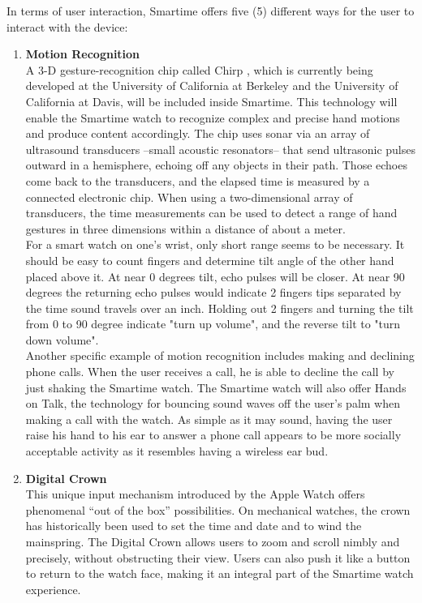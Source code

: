 \documentclass{article}
\begin{document}
In terms of user interaction, Smartime offers five (5) different ways for the user to interact with the device: 

\begin{enumerate}
\item \textbf{Motion Recognition}\\
A 3-D gesture-recognition chip called Chirp , which is currently being developed at the University of California at Berkeley and the University of California at Davis, will be included inside Smartime. \cite{metz2013} This technology will enable the Smartime watch to recognize complex and precise hand motions and produce content accordingly. The chip uses sonar via an array of ultrasound transducers --small acoustic resonators-- that send ultrasonic pulses outward in a hemisphere, echoing off any objects in their path. Those echoes come back to the transducers, and the elapsed time is measured by a connected electronic chip. When using a two-dimensional array of transducers, the time measurements can be used to detect a range of hand gestures in three dimensions within a distance of about a meter.\\ 

For a smart watch on one's wrist, only short range seems to be necessary. It should be easy to count fingers and determine tilt angle of the other hand placed above it. At near 0 degrees tilt, echo pulses will be closer. At near 90 degrees the returning echo pulses  would indicate 2 fingers tips separated by the time sound travels over an inch. Holding out 2 fingers and turning the tilt from 0 to 90 degree indicate "turn up volume", and the reverse tilt to "turn down volume".\\ 

Another specific example of motion recognition includes making and declining phone calls. When the user receives a call, he is able to decline the call by just shaking the Smartime watch. The Smartime watch will also offer Hands on Talk, the technology for bouncing sound waves off the user's palm when making a call with the watch.
As simple as it may sound, having the user raise his hand to his ear to answer a phone call appears to be more socially acceptable activity as it resembles having a wireless ear bud.

\item \textbf{Digital Crown}\\
This unique input mechanism introduced by the Apple Watch \cite{apple2014} offers phenomenal ``out of the box'' possibilities. On mechanical watches, the crown has historically been used to set the time and date and to wind the mainspring. The Digital Crown allows users to zoom and scroll nimbly and precisely, without obstructing their view. Users can also push it like a button to return to the watch face, making it an integral part of the Smartime watch experience. 


\end{enumerate}
\end{document}
